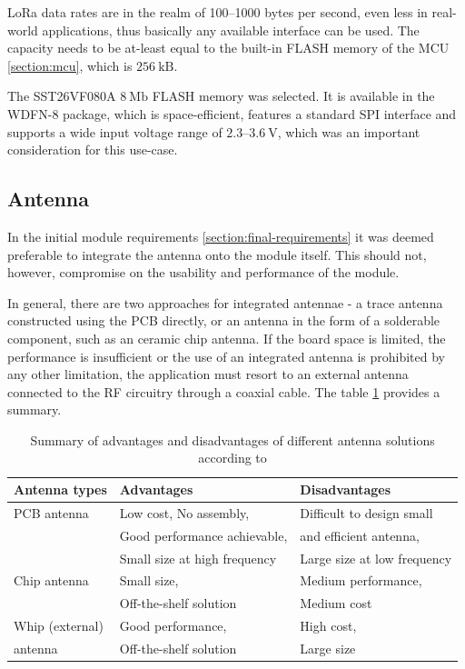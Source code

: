 LoRa data rates are in the realm of 100--1000 bytes per second, even less in real-world applications, thus basically any available interface can be used. The capacity needs to be at-least equal to the built-in FLASH memory of the MCU \ref{section:mcu}, which is $256~\mathrm{kB}$.

The SST26VF080A $8~\mathrm{Mb}$ FLASH memory was selected. It is available in the WDFN-8 package, which is space-efficient, features a standard SPI interface and supports a wide input voltage range of $2.3\text{--}3.6~\mathrm{V}$, which was an important consideration for this use-case.

\subsection{\label{section:antenna}Antenna}
In the initial module requirements \ref{section:final-requirements} it was deemed preferable to integrate the antenna onto the module itself. This should not, however, compromise on the usability and performance of the module. 

In general, there are two approaches for integrated antennae - a trace antenna constructed using the PCB directly, or an antenna in the form of a solderable component, such as an ceramic chip antenna. If the board space is limited, the performance is insufficient or the use of an integrated antenna is prohibited by any other limitation, the application must resort to an external antenna connected to the RF circuitry through a coaxial cable. The table \ref{table:antenna-solutions} provides a summary.

\begin{table}[H]
\begin{center}
\caption{\label{table:antenna-solutions}Summary of advantages and disadvantages of different antenna solutions according to \cite{andersen_selecting_2008}}
    \begin{tabular}{|l|l|l|}
    \hline
    \textbf{Antenna types} & \textbf{Advantages} & \textbf{Disadvantages} \\
    \hline
    PCB antenna  & Low cost, No assembly,        & Difficult to design small \\
                 & Good performance achievable,  & and efficient antenna, \\
                 & Small size at high frequency  & Large size at low frequency \\
    \hline
    Chip antenna & Small size,                   & Medium performance, \\
                 & Off-the-shelf solution        & Medium cost \\
    \hline
    Whip (external)& Good performance,           & High cost, \\
    antenna        & Off-the-shelf solution      & Large size \\
    \hline
    \end{tabular}
\end{center}
\end{table}

